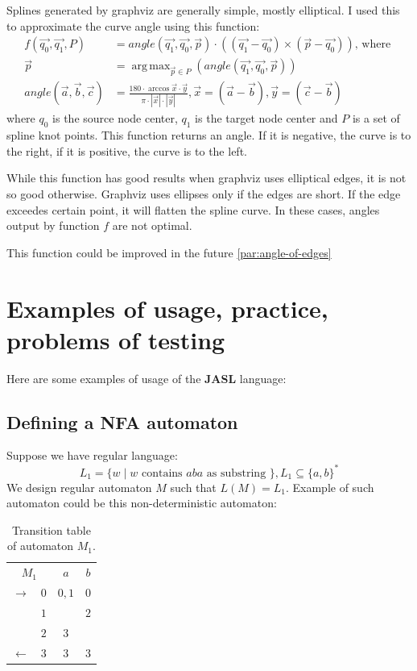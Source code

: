 \documentclass{ctuthesis}
\DeclareMathOperator*{\argmax}{arg\,max}
\begin{document}
Splines generated by graphviz are generally simple, mostly elliptical. I used this to approximate the curve angle using this function:
\begin{align*}
	f(\vec{q_0}, \vec{q_1}, P) &= angle(\vec{q_1}, \vec{q_0}, \vec{p}) \cdot ((\vec{q_1} - \vec{q_0})\times (\vec{p} - \vec{q_0})) \text{, where } \\
	\vec{p} &= \argmax_{\vec{p} \in P} (angle(\vec{q_1}, \vec{q_0}, \vec{p})) \\
	angle(\vec{a}, \vec{b}, \vec{c}) &= \frac{
		180 \cdot \arccos{ \vec{x} \cdot \vec{y} }}{ \pi \cdot |\vec{x}| \cdot |\vec{y}| }, \vec{x} = (\vec{a} - \vec{b}), \vec{y} = (\vec{c}-\vec{b})
\end{align*}
where $q_0$ is the source node center, $q_1$ is the target node center and $P$ is a set of spline knot points. This function returns an angle. If it is negative, the curve is to the right, if it is positive, the curve is to the left. 

While this function has good results when graphviz uses elliptical edges, it is not so good otherwise. Graphviz uses ellipses only if the edges are short. If the edge exceedes certain point, it will flatten the spline curve. In these cases, angles output by function $f$ are not optimal. 

This function could be improved in the future \ref{par:angle-of-edges}


\chapter{Examples of usage, practice, problems of testing}
Here are some examples of usage of the \textbf{JASL} language: 

\section{Defining a NFA automaton}
\label{sec:example_NFA}
Suppose we have regular language: 
\begin{equation*}
L_1 = \{w \mid w \text{ contains } aba \text{ as substring }\}, L_1 \subseteq \{a, b\}^*
\end{equation*} 
We design regular automaton $M$ such that $L(M) = L_1$. Example of such automaton could be this non-deterministic automaton:
\begin{table}[H]
\begin{ctucolortab}
\begin{tabular}{cc|cc}
\multicolumn{2}{c}{\bfseries $M_1$} & \bfseries $a$ & \bfseries $b$ \\\Midrule
$\rightarrow$ 	& $0$ & $0,1$ 	& $0$  \\
				& $1$ &  	& $2$  \\
				& $2$ & $3$		&  \\
$\leftarrow$	& $3$ & $3$		& $3$ 
\end{tabular}
\end{ctucolortab}
\caption{Transition table of automaton $M_1$.}
\label{fig:examples_NFA_table}
\end{table} 
\end{document}
